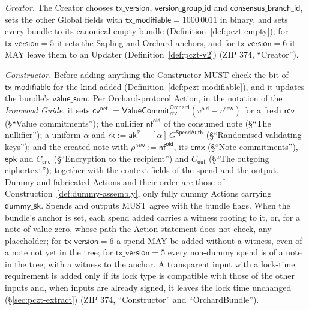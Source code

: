 \documentclass[11pt,a4paper]{article}
\theoremstyle{definition}
\newcommand{\PP}{\mathbb{P}}
\newcommand{\nfsym}{\mathsf{nf}}
\newcommand{\cmx}{\mathsf{cmx}}
\newcommand{\cvsym}{\mathsf{cv}}
\newcommand{\rk}{\mathsf{rk}}
\newcommand{\aksym}{\ensuremath{\mathsf{ak}}}
\newcommand{\rcv}{\ensuremath{\mathsf{rcv}}}
\begin{document}
\emph{Creator.} The Creator chooses $\mathsf{tx\_version}$,
$\mathsf{version\_group\_id}$ and $\mathsf{consensus\_branch\_id}$, sets the
other Global fields with $\mathsf{tx\_modifiable} = 1000\,0011$ in binary,
and sets every bundle to its canonical empty bundle
(Definition~\ref{def:pczt-empty}); for $\mathsf{tx\_version} = 5$ it sets
the Sapling and Orchard anchors, and for $\mathsf{tx\_version} = 6$ it MAY
leave them to an Updater (Definition~\ref{def:pczt-v2}) (ZIP 374,
``Creator'').

\emph{Constructor.} Before adding anything the Constructor MUST check the
bit of $\mathsf{tx\_modifiable}$ for the kind added
(Definition~\ref{def:pczt-modifiable}), and it updates the bundle's
$\mathsf{value\_sum}$. Per Orchard-protocol Action, in the notation of the
\emph{Ironwood Guide}, it sets $\cvsym^{\mathsf{net}} :=
\mathsf{ValueCommit}^{\mathsf{Orchard}}_{\rcv}(v^{\mathsf{old}} -
v^{\mathsf{new}})$ for a fresh $\rcv$ (\S``Value commitments''); the
nullifier $\nfsym^{\mathsf{old}}$ of the consumed note (\S``The
nullifier''); a uniform $\alpha$ and $\rk := \aksym^{\PP} +
[\alpha]\,G^{\mathsf{SpendAuth}}$ (\S``Randomised validating keys''); and
the created note with $\rho^{\mathsf{new}} := \nfsym^{\mathsf{old}}$, its
$\cmx$ (\S``Note commitments''), $\mathsf{epk}$ and $C_{\mathsf{enc}}$
(\S``Encryption to the recipient'') and $C_{\mathsf{out}}$ (\S``The
outgoing ciphertext''); together with the context fields of the spend and
the output. Dummy and fabricated Actions and their order are those of
Construction~\ref{def:dummy-assembly}, only fully dummy Actions carrying
$\mathsf{dummy\_sk}$. Spends and outputs MUST agree with the bundle flags.
When the bundle's anchor is set, each spend added carries a witness rooting
to it, or, for a note of value zero, whose path the Action statement does
not check, any placeholder; for $\mathsf{tx\_version} = 6$ a spend MAY be
added without a witness, even of a note not yet in the tree; for
$\mathsf{tx\_version} = 5$ every non-dummy spend is of a note in the tree,
with a witness to the anchor. A transparent input with a lock-time
requirement is added only if its lock type is compatible with those of the
other inputs and, when inputs are already signed, it leaves the lock time
unchanged (\S\ref{sec:pczt-extract}) (ZIP 374, ``Constructor'' and
``OrchardBundle'').
\end{document}
